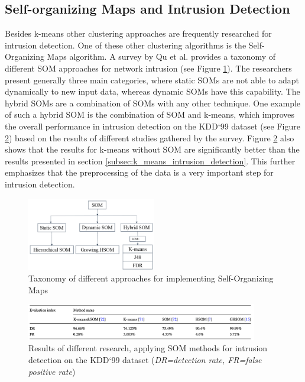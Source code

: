 \subsection{Self-organizing Maps and Intrusion Detection}
Besides k-means other clustering approaches are frequently researched for intrusion detection. One of these other clustering algorithms is the Self-Organizing Maps algorithm. A survey by Qu et al. \cite{qu2021survey} provides a taxonomy of different SOM approaches for network intrusion (see Figure \ref{fig:som_taxonomy}). The researchers present generally three main categories, where static SOMs are not able to adapt dynamically to new input data, whereas dynamic SOMs have this capability. The hybrid SOMs are a combination of SOMs with any other technique. One example of such a hybrid SOM is the combination of SOM and k-means, which improves the overall performance in intrusion detection on the KDD`99 dataset (see Figure \ref{fig:som_kmeans}) based on the results of different studies gathered by the survey. Figure \ref{fig:som_kmeans} also shows that the results for k-means without SOM are significantly better than the results presented in section \ref{subsec:k_means_intrusion_detection}. This further emphasizes that the preprocessing of the data is a very important step for intrusion detection.

\begin{figure}[H]
	\sffamily\footnotesize
	\includegraphics[width=0.5\textwidth]{pic/som_taxonomy.png}
	\unitlength=0.5mm
	\linethickness{0.4pt}
	\caption{Taxonomy of different approaches for implementing Self-Organizing Maps \cite{qu2021survey}}
	\label{fig:som_taxonomy}
\end{figure}

\begin{figure}[H]
	\sffamily\footnotesize
	\includegraphics[width=0.9\textwidth]{pic/som_kmeans.png}
	\unitlength=0.5mm
	\linethickness{0.4pt}
	\caption{Results of different research, applying SOM methods for intrusion detection on the KDD`99 dataset (\emph{DR=detection rate, FR=false positive rate}) \cite{qu2021survey}}
	\label{fig:som_kmeans}
\end{figure}